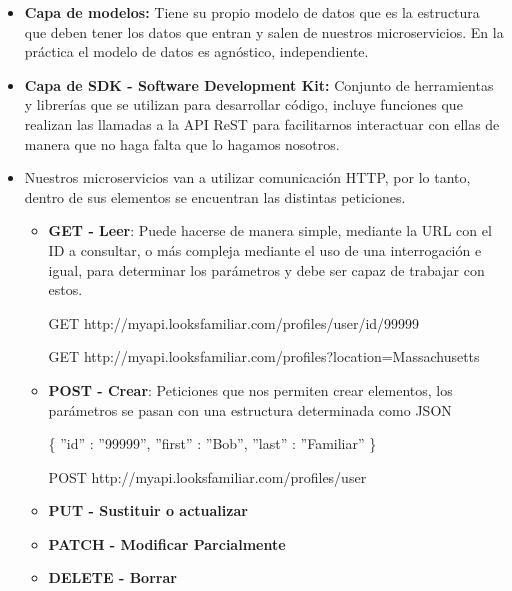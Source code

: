 \documentclass[12pt, twoside, openright]{report} %
\begin{document}
\begin{itemize}
	\item \textbf{Capa de modelos:} Tiene su propio modelo de datos que es la estructura que deben tener los datos que entran y salen de nuestros microservicios. En la práctica el modelo de datos es agnóstico, independiente.
	\item \textbf{Capa de SDK - Software Development Kit:} Conjunto de herramientas y librerías que se utilizan para desarrollar código, incluye funciones que realizan las llamadas a la API ReST para facilitarnos interactuar con ellas de manera que no haga falta que lo hagamos nosotros.
	\item Nuestros microservicios van a utilizar comunicación HTTP, por lo tanto, dentro de sus elementos se encuentran las distintas peticiones.
	      \begin{itemize}
		      \item \textbf{GET - Leer}: Puede hacerse de manera simple, mediante la URL con el ID a consultar, o más compleja mediante el uso de una interrogación e igual, para determinar los parámetros y debe ser capaz de trabajar con estos.

		            GET http://myapi.looksfamiliar.com/profiles/user/id/99999

		            GET http://myapi.looksfamiliar.com/profiles?location=Massachusetts

		      \item \textbf{POST - Crear}: Peticiones que nos permiten crear elementos, los parámetros se pasan con una estructura determinada como JSON

		            \{ ''id'' : ''99999'', ''first'' : ''Bob'', ''last'' : ''Familiar'' \}

		            POST http://myapi.looksfamiliar.com/profiles/user

		      \item \textbf{PUT - Sustituir o actualizar}
		      \item \textbf{PATCH - Modificar Parcialmente}
		      \item \textbf{DELETE - Borrar}
	      \end{itemize}
		  \pagebreak


\end{itemize}
\end{document}

